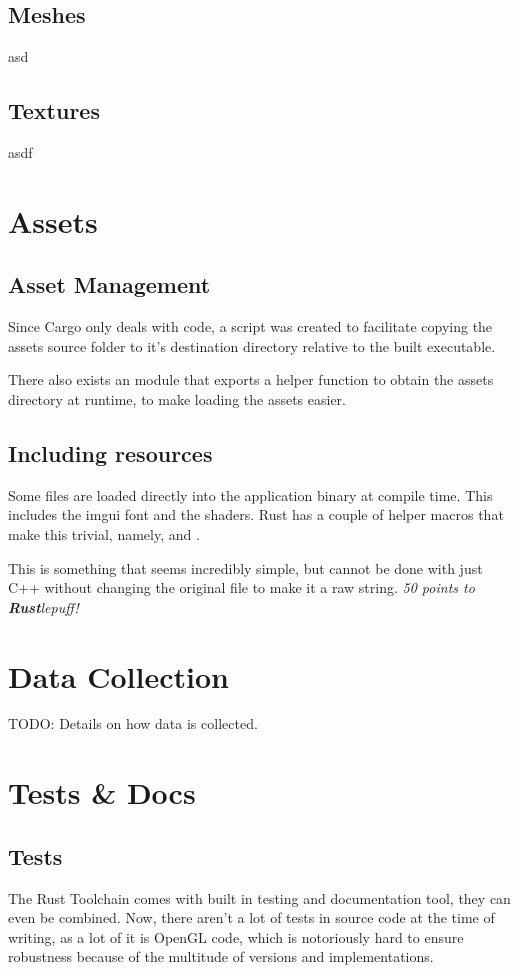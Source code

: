 \begin{multicols}{2}
  \subsection{Meshes}
  asd

  \subsection{Textures}
  asdf

  \section{Assets}

  \subsection{Asset Management}
  Since Cargo only deals with code, a  script was created to facilitate copying the assets source folder to it's destination directory relative to the built executable.

  There also exists an  module that exports a helper function  to obtain the assets directory at runtime, to make loading the assets easier.

  \subsection{Including resources}
  Some files are loaded directly into the application binary at compile time.
  This includes the imgui font and the shaders.
  Rust has a couple of helper macros that make this trivial, namely,  and .

  This is something that seems incredibly simple, but cannot be done with just C++ without changing the original file to make it a raw string.
  \emph{50 points to \textbf{Rust}lepuff!}

  \section{Data Collection}

  TODO: Details on how data is collected.

  \section{Tests \& Docs}

  \subsection{Tests}
  The Rust Toolchain comes with built in testing and documentation tool, they can even be combined.
  Now, there aren't a lot of tests in source code at the time of writing, as a lot of it is OpenGL code, which is notoriously hard to ensure robustness because of the multitude of versions and implementations.


\end{multicols}
